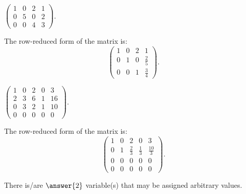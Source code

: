 \documentclass{ximera}
\begin{document}
\begin{exercise} \label{c2.3.11c}
$\left(\begin{array}{ccc|c}  1 & 0 & 2 & 1\\ 0 & 5 & 0 & 2 \\ 0 & 0 & 4 & 3
       \end{array}\right)$.
     \begin{multipleChoice}
     \end{multipleChoice}
     \begin{hint}
       The row-reduced form of the matrix is:
\[
\left(\begin{array}{rrr|r} 1 & 0 & 2 & 1 \\ 0 & 1 & 0 & \frac{2}{5}
\\ 0 & 0 & 1 & \frac{3}{4}\end{array}\right).
\]
     \end{hint}
\end{exercise}
\begin{exercise} \label{c2.3.11d}
$\left(\begin{array}{cccc|c} 1 & 0 & 2 & 0 & 3 \\ 2 & 3 & 6 & 1 & 16\\
         0 & 3 & 2 & 1 & 10 \\ 0 & 0 & 0 & 0 & 0  \end{array}\right)$.
     \begin{hint}
       \soln The row-reduced form of the matrix is:
\[
\left(\begin{array}{rrrr|r} 1 & 0 & 2 & 0 & 3 \\ 0 & 1 & \frac{2}{3}
& \frac{1}{3} & \frac{10}{3} \\ 0 & 0 & 0 & 0 & 0 \\ 0 & 0 & 0 & 0 & 0
\end{array}\right).
\]
     \end{hint}
          \begin{multipleChoice}
     \end{multipleChoice}
     \begin{exercise}
       There is/are $\answer{2}$ variable(s) that may be assigned arbitrary values.
     \end{exercise}
\end{exercise}
\end{document}
